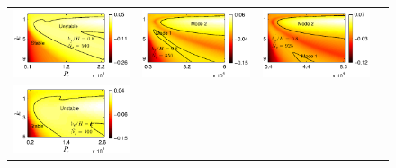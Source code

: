 \documentclass[aps,prl,twocolumn,superscriptaddress,10pt]{revtex4-1}  %
\begin{document}
\begin{figure}
\begin{tabular}{cccc}
{\includegraphics[scale = 0.85]{Set4_dens28_imgsc}} &
{\includegraphics[scale = 0.85]{Set4_dens32_imgsc}} &
{\includegraphics[scale = 0.85]{Set4_dens34_imgsc}} \\
{\includegraphics[scale = 0.85]{Set5_dens38_imgsc}} &

\end{tabular}
\end{figure}
\end{document}
